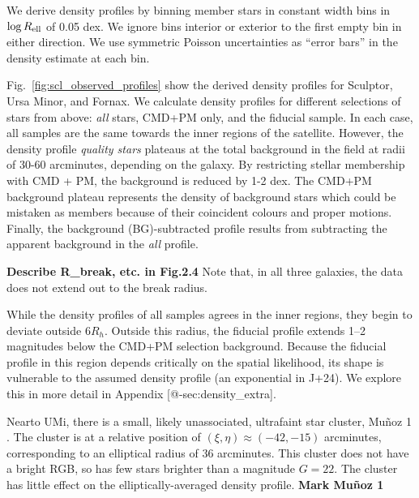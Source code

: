 We derive density profiles by binning member stars in constant width
bins in \(\log R_{\rm ell}\) of 0.05 dex. We ignore bins interior or
exterior to the first empty bin in either direction. We use symmetric
Poisson uncertainties as ``error bars'' in the density estimate at each
bin.

Fig.~\ref{fig:scl_observed_profiles} show the derived density profiles
for Sculptor, Ursa Minor, and Fornax. We calculate density profiles for
different selections of stars from above: \emph{all} stars, CMD+PM only,
and the fiducial sample. In each case, all samples are the same towards
the inner regions of the satellite. However, the density profile
\emph{quality stars} plateaus at the total background in the field at
radii of 30-60 arcminutes, depending on the galaxy. By restricting
stellar membership with CMD + PM, the background is reduced by 1-2 dex.
The CMD+PM background plateau represents the density of background stars
which could be mistaken as members because of their coincident colours
and proper motions. Finally, the background (BG)-subtracted profile
results from subtracting the apparent background in the \emph{all}
profile.

\textbf{Describe R\_break, etc. in Fig.2.4} Note that, in all three
galaxies, the data does not extend out to the break radius.

While the density profiles of all samples agrees in the inner regions,
they begin to deviate outside \(6 R_h\). Outside this radius, the
fiducial profile extends 1--2 magnitudes below the CMD+PM selection
background. Because the fiducial profile in this region depends
critically on the spatial likelihood, its shape is vulnerable to the
assumed density profile (an exponential in J+24). We explore this in
more detail in Appendix {[}@-sec:density\_extra{]}.

Nearto UMi, there is a small, likely unassociated, ultrafaint star
cluster, Muñoz 1 \citep{munoz+2012}. The cluster is at a relative
position of \((\xi, \eta) \approx(-42, -15)\) arcminutes, corresponding
to an elliptical radius of 36 arcminutes. This cluster does not have a
bright RGB, so has few stars brighter than a magnitude \(G=22\). The
cluster has little effect on the elliptically-averaged density profile.
\textbf{Mark Muñoz 1}

